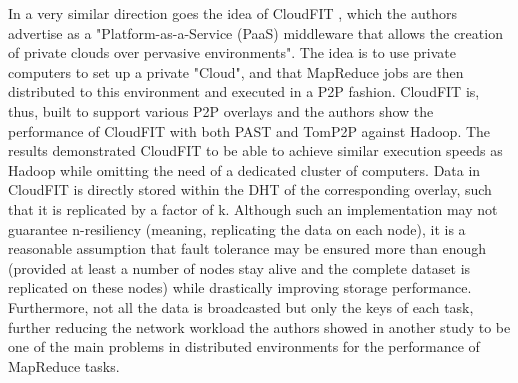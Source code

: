 In a very similar direction goes the idea of CloudFIT \cite{Steffenel2015}, which the authors advertise as a "Platform-as-a-Service (PaaS) middleware that allows the creation of private clouds over pervasive environments". The idea is to use private computers to set up a private "Cloud", and that MapReduce jobs are then distributed to this environment and executed in a P2P fashion. CloudFIT is, thus, built to support various P2P overlays and the authors show the performance of CloudFIT with both PAST and TomP2P against Hadoop. The results demonstrated CloudFIT to be able to achieve similar execution speeds as Hadoop while omitting the need of a dedicated cluster of computers. Data in CloudFIT is directly stored within the DHT of the corresponding overlay, such that it is replicated by a factor of k. Although such an implementation may not guarantee n-resiliency (meaning, replicating the data on each node), it is a reasonable assumption that fault tolerance may be ensured more than enough (provided at least a number of nodes stay alive and the complete dataset is replicated on these nodes) while drastically improving storage performance. Furthermore, not all the data is broadcasted but only the keys of each task, further reducing the network workload the authors showed in another study \cite{Steffenel2015a} to be one of the main problems in distributed environments for the performance of MapReduce tasks.

